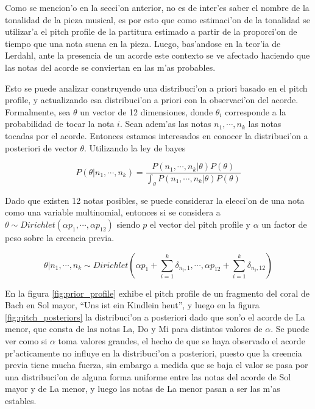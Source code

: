 Como se mencion'o en la secci'on anterior, no es de inter'es saber el nombre de la tonalidad de la pieza musical, es por esto que como estimaci'on de la 
tonalidad se utilizar'a el pitch profile de la partitura estimado a partir de la proporci'on de tiempo que una nota suena en la pieza. Luego, bas'andose en 
la teor'ia de Lerdahl, ante la presencia de un acorde este contexto se ve afectado haciendo que las notas del acorde se conviertan en las m'as probables.  

Esto se puede analizar construyendo una distribuci'on a priori basado en el pitch profile, y actualizando esa distribuci'on a priori con la observaci'on del acorde. 
Formalmente, sea $\theta$ un vector de 12 dimensiones, donde $\theta_i$ corresponde a la probabilidad de tocar la nota $i$. Sean adem'as las notas $n_1, \cdots, n_k$ las notas 
tocadas por el acorde. Entonces estamos interesados en conocer la distribuci'on a posteriori de vector $\theta$. Utilizando la ley de bayes

$$P(\theta|n_1, \cdots, n_k) = \frac{P(n_1,\cdots, n_k | \theta) P(\theta)}{\int_{\theta}P(n_1, \cdots, n_k | \theta) P(\theta)}$$

Dado que existen 12 notas posibles, se puede considerar la elecci'on de una nota como una variable multinomial, entonces 
si se considera a $\theta \sim Dirichlet(\alpha p_1, \cdots, \alpha p_{12})$ siendo $p$ el vector del pitch profile y $\alpha$ un factor de peso sobre la creencia previa.

$$\theta | n_1, \cdots, n_k \sim Dirichlet(\alpha p_1 + \sum_{i=1}^k \delta_{n_i,1}, \cdots, \alpha p_{12} + \sum_{i=1}^k \delta_{n_i,12})$$

En la figura \ref{fig:prior_profile} exhibe el pitch profile de un fragmento del coral de Bach en Sol mayor, ``Uns ist ein Kindlein heut'', 
y luego en la figura \ref{fig:pitch_posteriors}
la distribuci'on a posteriori dado que son'o el acorde de La menor, que consta de las notas La, Do y Mi para distintos valores de $\alpha$. 
Se puede ver como si $\alpha$ toma valores grandes, el hecho
de que se haya observado el acorde pr'acticamente no influye en la distribuci'on a posteriori, puesto que la creencia previa tiene mucha fuerza, sin embargo a medida que se baja el valor se pasa por una 
distribuci'on de alguna forma uniforme entre las notas del acorde de Sol mayor y de La menor, y luego las notas de La menor pasan a ser las m'as estables.

\begin{imagen}
    \width{10cm}
\end{imagen}

